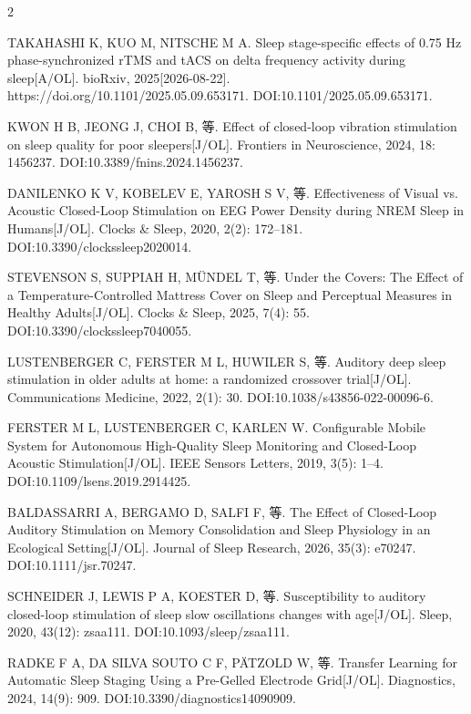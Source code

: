 \documentclass[UTF8,zihao=5,fontset=none]{ctexart}
\begin{document}
\begin{multicols}{2}
{\makebox[25.2pt][l]{[66]}TAKAHASHI K, KUO M, NITSCHE M A. Sleep stage-specific effects of 0.75 Hz phase-synchronized rTMS and tACS on delta frequency activity during sleep[A/OL]. bioRxiv, 2025[2026-08-22]. https://doi.org/10.1101/2025.05.09.653171. DOI:10.1101/2025.05.09.653171.\par
\makebox[25.2pt][l]{[67]}KWON H B, JEONG J, CHOI B, 等. Effect of closed-loop vibration stimulation on sleep quality for poor sleepers[J/OL]. Frontiers in Neuroscience, 2024, 18: 1456237. DOI:10.3389/fnins.2024.1456237.\par
\makebox[25.2pt][l]{[68]}DANILENKO K V, KOBELEV E, YAROSH S V, 等. Effectiveness of Visual vs. Acoustic Closed-Loop Stimulation on EEG Power Density during NREM Sleep in Humans[J/OL]. Clocks \& Sleep, 2020, 2(2): 172--181. DOI:10.3390/clockssleep2020014.\par
\makebox[25.2pt][l]{[69]}STEVENSON S, SUPPIAH H, MÜNDEL T, 等. Under the Covers: The Effect of a Temperature-Controlled Mattress Cover on Sleep and Perceptual Measures in Healthy Adults[J/OL]. Clocks \& Sleep, 2025, 7(4): 55. DOI:10.3390/clockssleep7040055.\par
\makebox[25.2pt][l]{[70]}LUSTENBERGER C, FERSTER M L, HUWILER S, 等. Auditory deep sleep stimulation in older adults at home: a randomized crossover trial[J/OL]. Communications Medicine, 2022, 2(1): 30. DOI:10.1038/s43856-022-00096-6.\par
\makebox[25.2pt][l]{[71]}FERSTER M L, LUSTENBERGER C, KARLEN W. Configurable Mobile System for Autonomous High-Quality Sleep Monitoring and Closed-Loop Acoustic Stimulation[J/OL]. IEEE Sensors Letters, 2019, 3(5): 1--4. DOI:10.1109/lsens.2019.2914425.\par
\makebox[25.2pt][l]{[72]}BALDASSARRI A, BERGAMO D, SALFI F, 等. The Effect of Closed-Loop Auditory Stimulation on Memory Consolidation and Sleep Physiology in an Ecological Setting[J/OL]. Journal of Sleep Research, 2026, 35(3): e70247. DOI:10.1111/jsr.70247.\par
\makebox[25.2pt][l]{[73]}SCHNEIDER J, LEWIS P A, KOESTER D, 等. Susceptibility to auditory closed-loop stimulation of sleep slow oscillations changes with age[J/OL]. Sleep, 2020, 43(12): zsaa111. DOI:10.1093/sleep/zsaa111.\par
\makebox[25.2pt][l]{[74]}RADKE F A, DA SILVA SOUTO C F, PÄTZOLD W, 等. Transfer Learning for Automatic Sleep Staging Using a Pre-Gelled Electrode Grid[J/OL]. Diagnostics, 2024, 14(9): 909. DOI:10.3390/diagnostics14090909.\par
}
\end{multicols}
\end{document}
